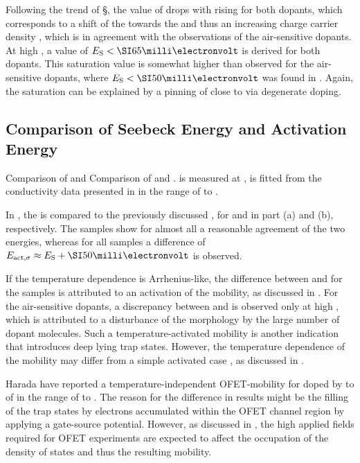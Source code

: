 Following the trend of \S, the value of \Es drops with rising \C for both dopants, which corresponds to a shift of the \EfLong \Ef towards the \EtLong \Et and thus an increasing charge carrier density \ne, which is in agreement with the observations of the air-sensitive dopants.
%
At high \CLongs, a value of $\Es<\meV{65}$ is derived for both dopants. This saturation value is somewhat higher than observed for the air-sensitive dopants, where $\Es<\meV{50}$ was found in . Again, the saturation can be explained by a pinning of \Ef close to \Et via degenerate doping.

\subsection{Comparison of Seebeck Energy and Activation Energy}
\label{sec:ResAS-EsEact}

%
{Comparison of \Es and \Eact}
{Comparison of \EsLongL and \EactLongL. \Es is measured at \Tm[40], \Eact is fitted from the conductivity data presented in  in the range of \T[25] to .}

In , the \EsLongL is compared to the previously discussed \EactLongL, for \aob and \dmbi in part (a) and (b), respectively.
The \dmbi samples show for almost all \CLongs a reasonable agreement of the two energies, whereas for all \aob samples a difference of \mbox{$\Eact\approx\Es+\meV{50}$} is observed.

If the temperature dependence is Arrhenius-like, the difference between \Eact and \Es for the \aob samples is attributed to an activation of the mobility, as discussed in .
For the air-sensitive dopants, a discrepancy between \Eact and \Es is observed only at high \C, which is attributed to a disturbance of the morphology by the large number of dopant molecules.
Such a temperature-activated mobility is another indication that \aob introduces deep lying trap states.
%
However, the temperature dependence of the mobility may differ from a simple activated case%
, as discussed in .

Harada\etal\cite{Harada2007} have reported a temperature-independent OFET-mobility for \CS doped by \C[0.010] to  of \aob in the range of \T[30] to . The reason for the difference in results might be the filling of the trap states by electrons accumulated within the OFET channel region by applying a gate-source potential. However, as discussed in , the high applied fields required for OFET experiments are expected to affect the occupation of the density of states and thus the resulting mobility.

